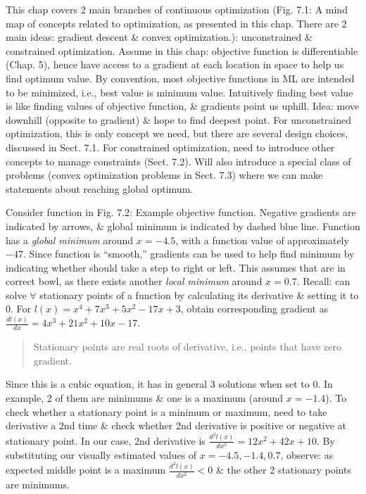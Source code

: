 \documentclass{article}
\begin{document}
\begin{itemize}
\begin{quote}
	\end{quote}
	This chap covers 2 main branches of continuous optimization ({\sf Fig. 7.1: A mind map of concepts related to optimization, as presented in this chap. There are 2 main ideas: gradient descent \& convex optimization.}): unconstrained \& constrained optimization. Assume in this chap: objective function is differentiable (Chap. 5), hence have access to a gradient at each location in space to help us find optimum value. By convention, most objective functions in ML are intended to be minimized, i.e., best value is minimum value. Intuitively finding best value is like finding values of objective function, \& gradients point us uphill. Idea: move downhill (opposite to gradient) \& hope to find deepest point. For unconstrained optimization, this is only concept we need, but there are several design choices, discussed in Sect. 7.1. For constrained optimization, need to introduce other concepts to manage constraints (Sect. 7.2). Will also introduce a special class of problems (convex optimization problems in Sect. 7.3) where we can make statements about reaching global optimum.
	
	Consider function in {\sf Fig. 7.2: Example objective function. Negative gradients are indicated by arrows, \& global minimum is indicated by dashed blue line}. Function has a {\it global minimum} around $x = -4.5$, with a function value of approximately $-47$. Since function is ``smooth,'' gradients can be used to help find minimum by indicating whether should take a step to right or left. This assumes that are in correct bowl, as there exists another {\it local minimum} around $x = 0.7$. Recall: can solve $\forall$ stationary points of a function by calculating its derivative \& setting it to 0. For $l(x) = x^4 + 7x^3 + 5x^2 - 17x + 3$, obtain corresponding gradient as $\frac{dl(x)}{dx} = 4x^3 + 21x^2 + 10x - 17$.
	\begin{quote}
		Stationary points are real roots of derivative, i.e., points that have zero gradient.
	\end{quote}
	Since this is a cubic equation, it has in general 3 solutions when set to 0. In example, 2 of them are minimums \& one is a maximum (around $x = -1.4$). To check whether a stationary point is a minimum or maximum, need to take derivative a 2nd time \& check whether 2nd derivative is positive or negative at stationary point. In our case, 2nd derivative is $\frac{d^2l(x)}{dx^2} = 12x^2 + 42x + 10$. By substituting our visually estimated values of $x = -4.5,-1.4,0.7$, observe: as expected middle point is a maximum $\frac{d^2l(x)}{dx^2} < 0$ \& the other 2 stationary points are minimums.
	

\end{itemize}
\end{document}
